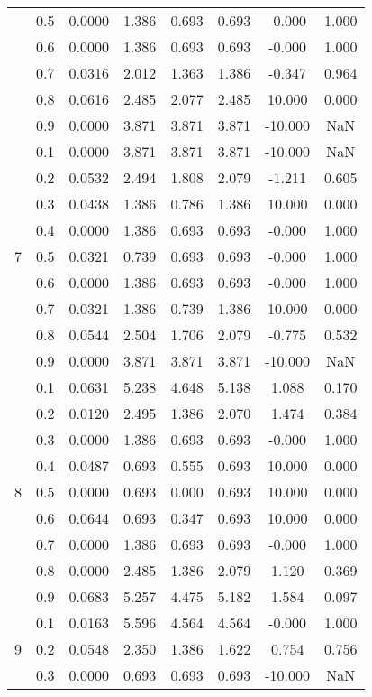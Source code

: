 \documentclass[11pt,a4paper]{report}
\begin{document}
\begin{longtable}{ | c | c || c | c | c | c | c | c | }
 & 0.5 & 0.0000 & 1.386 & 0.693 & 0.693 & -0.000 & 1.000 \\
 & 0.6 & 0.0000 & 1.386 & 0.693 & 0.693 & -0.000 & 1.000 \\
 & 0.7 & 0.0316 & 2.012 & 1.363 & 1.386 & -0.347 & 0.964 \\
 & 0.8 & 0.0616 & 2.485 & 2.077 & 2.485 & 10.000 & 0.000 \\
 & 0.9 & 0.0000 & 3.871 & 3.871 & 3.871 & -10.000 & NaN \\
 \hline
\multirow{9}{*}{7} & 0.1 & 0.0000 & 3.871 & 3.871 & 3.871 & -10.000 & NaN \\
 & 0.2 & 0.0532 & 2.494 & 1.808 & 2.079 & -1.211 & 0.605 \\
 & 0.3 & 0.0438 & 1.386 & 0.786 & 1.386 & 10.000 & 0.000 \\
 & 0.4 & 0.0000 & 1.386 & 0.693 & 0.693 & -0.000 & 1.000 \\
 & 0.5 & 0.0321 & 0.739 & 0.693 & 0.693 & -0.000 & 1.000 \\
 & 0.6 & 0.0000 & 1.386 & 0.693 & 0.693 & -0.000 & 1.000 \\
 & 0.7 & 0.0321 & 1.386 & 0.739 & 1.386 & 10.000 & 0.000 \\
 & 0.8 & 0.0544 & 2.504 & 1.706 & 2.079 & -0.775 & 0.532 \\
 & 0.9 & 0.0000 & 3.871 & 3.871 & 3.871 & -10.000 & NaN \\
 \hline
\multirow{9}{*}{8} & 0.1 & 0.0631 & 5.238 & 4.648 & 5.138 & 1.088 & 0.170 \\
 & 0.2 & 0.0120 & 2.495 & 1.386 & 2.070 & 1.474 & 0.384 \\
 & 0.3 & 0.0000 & 1.386 & 0.693 & 0.693 & -0.000 & 1.000 \\
 & 0.4 & 0.0487 & 0.693 & 0.555 & 0.693 & 10.000 & 0.000 \\
 & 0.5 & 0.0000 & 0.693 & 0.000 & 0.693 & 10.000 & 0.000 \\
 & 0.6 & 0.0644 & 0.693 & 0.347 & 0.693 & 10.000 & 0.000 \\
 & 0.7 & 0.0000 & 1.386 & 0.693 & 0.693 & -0.000 & 1.000 \\
 & 0.8 & 0.0000 & 2.485 & 1.386 & 2.079 & 1.120 & 0.369 \\
 & 0.9 & 0.0683 & 5.257 & 4.475 & 5.182 & 1.584 & 0.097 \\
 \hline
\multirow{9}{*}{9} & 0.1 & 0.0163 & 5.596 & 4.564 & 4.564 & -0.000 & 1.000 \\
 & 0.2 & 0.0548 & 2.350 & 1.386 & 1.622 & 0.754 & 0.756 \\
 & 0.3 & 0.0000 & 0.693 & 0.693 & 0.693 & -10.000 & NaN \\

\end{longtable}
\end{document}

